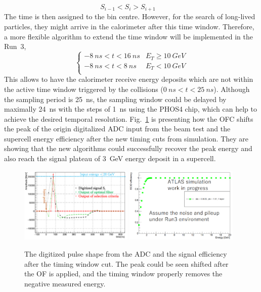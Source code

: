 \begin{equation}
S_{i-1}<S_{i}>S_{i+1}\quad 
\end{equation}
The time is then assigned to the bin centre. However, for the search of long-lived particles, they might arrive in the calorimeter after this time window. Therefore, a more flexible algorithm to extend the time window will be implemented in the Run~3,
\begin{equation}
\begin{cases}
-8~ns<t<16~ns & E_{T}\geq 10~GeV \\
-8~ns<t<8~ns & E_{T}<10~GeV \\
\end{cases}
\end{equation}
This allows to have the calorimeter receive energy deposits which are not within the active time window triggered by the collisions ($0~ns<t<25~ns$). Although the sampling period is 25~ns, the sampling window could be delayed by maximally 24~ns with the steps of 1~ns using the PHOS4 chip\cite{Toifl:1999qv}, which can help to achieve the desired temporal resolution. Fig.~\ref{Fig:OFC} is presenting how the OFC shifts the peak of the origin digitalized ADC input from the beam test and the supercell energy efficiency after the new timing cuts from simulation. They are showing that the new algorithms could successfully recover the peak energy and also reach the signal plateau of 3~GeV energy deposit in a supercell.
\begin{figure}[!h]                
	\includegraphics[width=0.48\textwidth]{Chapter6/Pulse.png}
	\includegraphics[width=0.48\textwidth]{Chapter6/TimeWindow.png}
	\begin{center}
		\caption{The digitized pulse shape from the ADC and the signal efficiency after the timing window cut. The peak could be seen shifted after the OF is applied, and the timing window properly removes the negative measured energy. }
		\label{Fig:OFC}            
	\end{center}
\end{figure}

